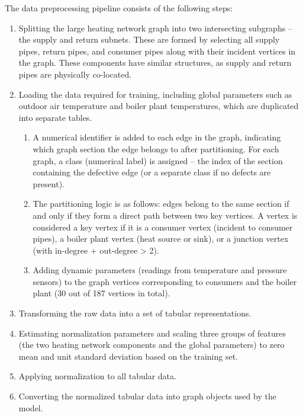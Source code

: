 \documentclass[energies,article,submit,pdftex,moreauthors]{Definitions/mdpi}
\begin{document}
The data preprocessing pipeline consists of the following steps:
\renewcommand{\labelenumii}{\arabic{enumi}.\arabic{enumii}}
\renewcommand{\labelenumiii}{\arabic{enumi}.\arabic{enumii}.\arabic{enumiii}}
\renewcommand{\labelenumiv}{\arabic{enumi}.\arabic{enumii}.\arabic{enumiii}.\arabic{enumiv}}
\begin{enumerate}
	\item Splitting the large heating network graph into two intersecting subgraphs --
	      the supply and return subnets. These are formed by selecting all supply pipes,
	      return pipes, and consumer pipes along with their incident vertices in the
	      graph. These components have similar structures, as supply and return pipes are
	      physically co-located.
	\item Loading the data required for training, including global parameters such as
	      outdoor air temperature and boiler plant temperatures, which are duplicated
	      into separate tables.
	      \begin{enumerate}
		      \item A numerical identifier is added to each edge in the graph, indicating which
		            graph section the edge belongs to after partitioning. For each graph, a class
		            (numerical label) is assigned -- the index of the section containing the
		            defective edge (or a separate class if no defects are present).
		      \item The partitioning logic is as follows: edges belong to the same section if and
		            only if they form a direct path between two key vertices. A vertex is
		            considered a key vertex if it is a consumer vertex (incident to consumer
		            pipes), a boiler plant vertex (heat source or sink), or a junction vertex (with
		            in-degree + out-degree > 2).
		      \item Adding dynamic parameters (readings from temperature and pressure sensors) to
		            the graph vertices corresponding to consumers and the boiler plant (30 out of
		            187 vertices in total).
	      \end{enumerate}
	\item Transforming the raw data into a set of tabular representations.
	\item Estimating normalization parameters and scaling three groups of features (the
	      two heating network components and the global parameters) to zero mean and unit
	      standard deviation based on the training set.
	\item Applying normalization to all tabular data.
	\item Converting the normalized tabular data into graph objects used by the model.
\end{enumerate}
\end{document}
